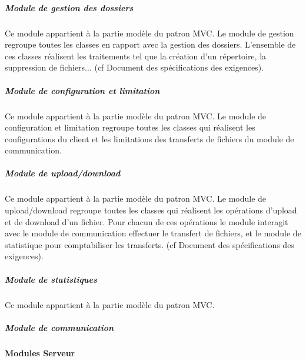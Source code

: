 \documentclass[10pt,a4paper]{report}
\begin{document}
	
				\subparagraph{Module de gestion des dossiers}
				\begin{flushleft}
				Ce module appartient à la partie modèle du patron MVC. Le module de gestion regroupe  toutes les classes en rapport avec la gestion des dossiers. L'ensemble de ces classes réalisent les traitements tel que la création d'un répertoire, la suppression de fichiers... (cf Document des spécifications des exigences).\\ 
				\end{flushleft}
	
				\subparagraph{Module de configuration et limitation}	
				\begin{flushleft}
				Ce module appartient à la partie modèle du patron MVC. Le module de configuration et limitation regroupe toutes les classes qui réalisent les configurations du client et les limitations des transferts de fichiers du module de communication.
				\end{flushleft}
	
				\subparagraph{Module de upload/download}
				\begin{flushleft}
				Ce module appartient à la partie modèle du patron MVC. Le module de upload/download regroupe toutes les classes qui réalisent les opérations d'upload et de download d'un fichier. Pour chacun de ces opérations le module interagit avec le module de communication effectuer le transfert de fichiers, et le module de statistique pour comptabiliser les transferts. (cf Document des spécifications des exigences).
				\end{flushleft}
	
				\subparagraph{Module de statistiques}
				Ce module appartient à la partie modèle du patron MVC.
	
				\subparagraph{Module de communication}

\newpage
			\paragraph{Modules Serveur}
\end{document}
